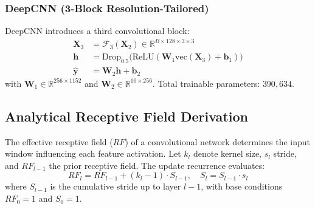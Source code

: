\documentclass[conference]{IEEEtran}
\newcommand{\R}{\mathbb{R}}
\begin{document}
\subsubsection{DeepCNN (3-Block Resolution-Tailored)}
DeepCNN introduces a third convolutional block:
\begin{align}
\mathbf{X}_3 &= \mathcal{F}_3(\mathbf{X}_2) \in \R^{B \times 128 \times 3 \times 3} \label{eq:deep_b3} \\
\mathbf{h}   &= \text{Drop}_{0.5}\big(\text{ReLU}(\mathbf{W}_1 \text{vec}(\mathbf{X}_3) + \mathbf{b}_1)\big) \label{eq:deep_fc1} \\
\hat{\mathbf{y}} &= \mathbf{W}_2 \mathbf{h} + \mathbf{b}_2 \label{eq:deep_out}
\end{align}
with $\mathbf{W}_1 \in \R^{256 \times 1152}$ and $\mathbf{W}_2 \in \R^{10 \times 256}$. Total trainable parameters: $390{,}634$.

\subsection{Analytical Receptive Field Derivation}
The effective receptive field ($RF$) of a convolutional network determines the input window influencing each feature activation. Let $k_l$ denote kernel size, $s_l$ stride, and $RF_{l-1}$ the prior receptive field. The update recurrence evaluates:
\begin{equation}
RF_l = RF_{l-1} + (k_l - 1) \cdot S_{l-1}, \quad S_l = S_{l-1} \cdot s_l
\end{equation}
where $S_{l-1}$ is the cumulative stride up to layer $l-1$, with base conditions $RF_0 = 1$ and $S_0 = 1$.
\end{document}
